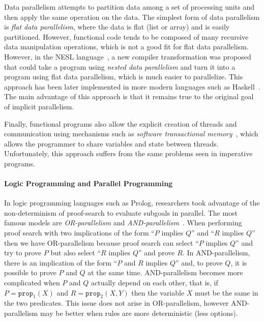 Data parallelism attempts to partition data among a set of processing units and
then apply the same operation on the data. The simplest form of data parallelism
is \emph{flat data parallelism}, where the data is flat (list or array) and is
easily partitioned. However, functional code tends to be composed of many recursive
data manipulation operations, which is not a good fit for flat data parallelism.
However, in the NESL language~\cite{Blelloch:1996:PPA:227234.227246}, a new compiler
transformation was proposed that could take a program using \emph{nested data
parallelism} and turn it into a program using flat data parallelism, which is
much easier to parallelize. This approach has been later implemented in more
modern languages such as Haskell~\cite{Chakravarty07dataparallel}. The main
advantage of this approach is that it remains true to the original goal of
implicit parallelism.

Finally, functional programs also allow the explicit creation of threads and
communication using mechanisms such as \emph{software transactional
memory}~\cite{harris2005composable}, which allows the programmer to share
variables and state between threads. Unfortunately, this approach suffers from
the same problems seen in imperative programs.

\paragraph{Logic Programming and Parallel Programming}

In logic programming languages such as Prolog, researchers took advantage of the
non-determinism of proof-search to evaluate subgoals in parallel. The most
famous models are \emph{OR-parallelism} and
\emph{AND-parallelism}~\cite{Gupta:2001:PEP:504083.504085}. When performing
proof search with two implications of the form ``$P$ implies $Q$'' and ``$R$
implies $Q$'' then we have OR-parallelism because proof search can select ``$P$
implies $Q$'' and try to prove $P$ but also select ``$R$ implies $Q$'' and prove
$R$. In AND-parallelism, there is an implication of the form ``$P$ and $R$
implies $Q$'' and, to prove $Q$, it is possible to prove $P$ and $Q$ at the same
time. AND-parallelism becomes more complicated when $P$ and $Q$ actually depend
on each other, that is, if $P = \mathtt{prop}_1(X)$ and $R = \mathtt{prop}_2(X,
Y)$ then the variable $X$ must be the same in the two predicates. This issue
does not arise in OR-parallelism, however AND-parallelism may be better when
rules are more deterministic (less options).

